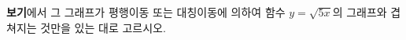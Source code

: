 \hspace*{2mm}\begin{minipage}[t]{\dimexpr\linewidth-2mm\relax}\vspace{0pt}
\textbf{보기}에서 그 그래프가 평행이동 또는 대칭이동에 의하여 함수 $y=\sqrt{5x}$의 그래프와 겹쳐지는 것만을 있는 대로 고르시오. \end{minipage}
